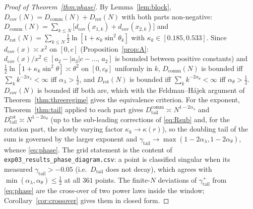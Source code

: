 \documentclass[11pt,reqno]{amsart}
\theoremstyle{plain}
\theoremstyle{definition}
\theoremstyle{remark}
\numberwithin{equation}{section}
\newcommand{\Dcov}{D_{\mathrm{cov}}}
\newcommand{\Dcomm}{D_{\mathrm{comm}}}
\newcommand{\Drot}{D_{\mathrm{rot}}}
\newcommand{\Dtail}{D_{\mathrm{tail}}}
\newcommand{\gtail}{\gamma_{\mathrm{tail}}}
\begin{document}
\begin{proof}[Proof of Theorem~\ref{thm:phase}]
By Lemma~\ref{lem:block}, $\Dcov(N)=\Dcomm(N)+\Drot(N)$ with both parts non-negative: $\Dcomm(N)=\sum_{k\le N}\bigl[d_{\mathrm{cov}}(x_{1,k})+d_{\mathrm{cov}}(x_{2,k})\bigr]$ and $\Drot(N)=\sum_{k\le N}\frac12\ln[1+\kappa_k\sin^2\theta_k]$ with $\kappa_k\in[0.185,0.533]$. Since $d_{\mathrm{cov}}(x)\asymp x^2$ on $[0,c]$ (Proposition~\ref{prop:A}: $d_{\mathrm{cov}}(x)/x^2\in[a_2-|a_3|c-\dots,\,a_2]$ is bounded between positive constants) and $\frac12\ln[1+\kappa_k\sin^2\theta]\asymp\theta^2$ on $[0,c_\theta]$ uniformly in $k$, $\Dcomm(N)$ is bounded iff $\sum_kk^{-2\alpha_\lambda}<\infty$ iff $\alpha_\lambda>\tfrac12$, and $\Drot(N)$ is bounded iff $\sum_kk^{-2\alpha_\theta}<\infty$ iff $\alpha_\theta>\tfrac12$. $\Dcov(N)$ is bounded iff both are, which with the Feldman--H\'ajek argument of Theorem~\ref{thm:threeregime} gives the equivalence criterion. For the exponent, Theorem~\ref{thm:tail} applied to each part gives $\Dtail^{\mathrm{comm}}\asymp N^{1-2\alpha_\lambda}$ and $\Dtail^{\mathrm{rot}}\asymp N^{1-2\alpha_\theta}$ (up to the sub-leading corrections of \eqref{eq:Rsub} and, for the rotation part, the slowly varying factor $\kappa_k\to\kappa(r)$), so the doubling tail of the sum is governed by the larger exponent and $\gtail\to\max(1-2\alpha_\lambda,1-2\alpha_\theta)$, whence \eqref{eq:phase}. The grid statement is the content of \texttt{exp03\_results\_phase\_diagram.csv}: a point is classified singular when its measured $\gtail>-0.05$ (i.e.\ $\Dtail$ does not decay), which agrees with $\min(\alpha_\lambda,\alpha_\theta)\le\tfrac12$ at all $361$ points. The finite-$N$ deviations of $\gtail^+$ from \eqref{eq:phase} are the cross-over of two power laws inside the window; Corollary~\ref{cor:crossover} gives them in closed form.
\end{proof}
\end{document}
